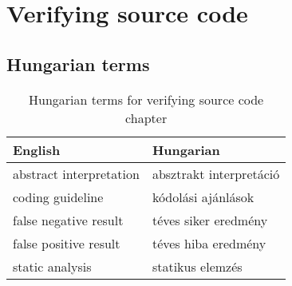 \chapter{Verifying source code}


\section{Hungarian terms}

\begin{table}[ht]
    \centering
    \small
    \caption{Hungarian terms for verifying source code chapter}
    \begin{tabular}{ll}
        \toprule
        \textbf{English} & \textbf{Hungarian} \\
        \midrule
        abstract interpretation & absztrakt interpretáció \\
        coding guideline & kódolási ajánlások \\
        false negative result & téves siker eredmény \\
        false positive result & téves hiba eredmény \\
        static analysis & statikus elemzés \\
        \bottomrule
        \end{tabular}
        \label{tab:overview:hungarian-terms-code}
        \end{table}